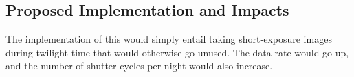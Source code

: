 \subsection{Proposed Implementation and Impacts}

The implementation of this would simply entail taking short-exposure
images during twilight time that would otherwise go unused. The data
rate would go up, and the number of shutter cycles per night would also
increase.

%
%

%
%
%
%
%
%
%
%
%
%
